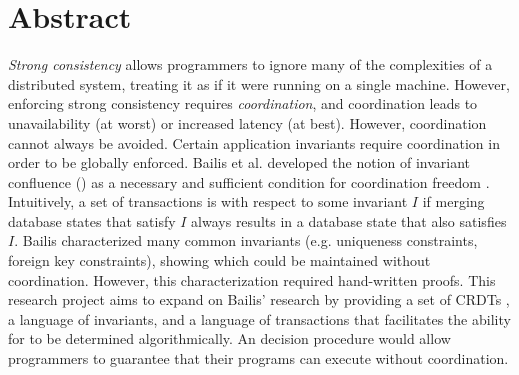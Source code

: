 \section{Abstract}
\emph{Strong consistency} allows programmers to ignore many of the complexities
of a distributed system, treating it as if it were running on a single machine.
However, enforcing strong consistency requires \emph{coordination}, and
coordination leads to unavailability \cite{gilbert2002brewer} (at worst) or
increased latency (at best). However, coordination cannot always be avoided.
Certain application invariants require coordination in order to be globally
enforced. Bailis et al. developed the notion of invariant confluence
(\iconfluence{}) as a necessary and sufficient condition for coordination
freedom \cite{bailis2014coordination}. Intuitively, a set of transactions is
\iconfluent{} with respect to some invariant $I$ if merging database states
that satisfy $I$ always results in a database state that also satisfies $I$.
Bailis characterized many common invariants (e.g. uniqueness constraints,
foreign key constraints), showing which could be maintained without
coordination. However, this characterization required hand-written proofs. This
research project aims to expand on Bailis' research by providing a set of
CRDTs \cite{shapiro2011comprehensive, shapiro2011conflict}, a language of
invariants, and a language of transactions that facilitates the ability for
\iconfluence{} to be determined algorithmically. An \iconfluence{} decision
procedure would allow programmers to guarantee that their programs can execute
without coordination.
